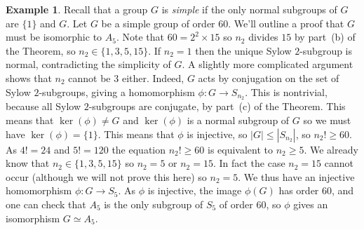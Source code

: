 \documentclass{amsart}
\newcommand{\tm}        {\times}
\newcommand{\xra}       {\xrightarrow}
\renewcommand{\:}{\colon}
\theoremstyle{definition}
\newtheorem{example}[theorem]{Example}
\begin{document}
\begin{example}
 Recall that a group $G$ is \emph{simple} if the only normal subgroups
 of $G$ are $\{1\}$ and $G$.  Let $G$ be a simple group of order
 $60$.  We'll outline a proof that $G$ must be isomorphic to $A_5$.
 Note that $60=2^2\tm 15$ so $n_2$ divides $15$ by part~(b) of the
 Theorem, so $n_2\in\{1,3,5,15\}$.  If $n_2=1$ then the unique Sylow
 $2$-subgroup is normal, contradicting the simplicity of $G$.  A
 slightly more complicated argument shows that $n_2$ cannot be $3$
 either.  Indeed, $G$ acts by conjugation on the set of Sylow
 $2$-subgroups, giving a homomorphism $\phi\:G\xra{}S_{n_2}$.  This is
 nontrivial, because all Sylow $2$-subgroups are conjugate, by
 part~(c) of the Theorem.  This means that $\ker(\phi)\neq G$ and
 $\ker(\phi)$ is a normal subgroup of $G$ so we must have
 $\ker(\phi)=\{1\}$.  This means that $\phi$ is injective, so
 $|G|\leq|S_{n_2}|$, so $n_2!\geq 60$.  As $4!=24$ and $5!=120$ the
 equation $n_2!\geq 60$ is equivalent to $n_2\geq 5$.  We already know
 that $n_2\in\{1,3,5,15\}$ so $n_2=5$ or $n_2=15$.  In fact the case
 $n_2=15$ cannot occur (although we will not prove this here) so
 $n_2=5$.  We thus have an injective homomorphism $\phi\:G\xra{}S_5$.
 As $\phi$ is injective, the image $\phi(G)$ has order $60$, and one
 can check that $A_5$ is the only subgroup of $S_5$ of order $60$, so
 $\phi$ gives an isomorphism $G\simeq A_5$.
\end{example}
\end{document}
